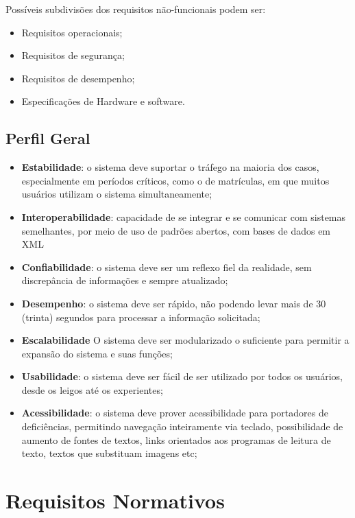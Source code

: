 \documentclass{book}
\begin{document}
Possíveis subdivisões dos requisitos não-funcionais podem ser: \\

\begin{itemize}
	\item Requisitos operacionais;
	\item Requisitos de segurança;
	\item Requisitos de desempenho;
	\item Especificações de Hardware e software.
\end{itemize}


\subsection{Perfil Geral}

\begin{itemize}
	\item \textbf{Estabilidade}: o sistema deve suportar o tráfego na maioria dos casos,
	especialmente em períodos críticos, como o de matrículas, em que muitos usuários utilizam o 
	sistema simultaneamente;
	\item \textbf{Interoperabilidade}: capacidade de se integrar e se comunicar com sistemas semelhantes,
	por meio de uso de padrões abertos, com bases de dados em XML
	\item \textbf{Confiabilidade}: o sistema deve ser um reflexo fiel da realidade, sem
	discrepância de informações e sempre atualizado;
	\item \textbf{Desempenho}: o sistema deve ser rápido, não podendo levar mais de 30 (trinta)
	segundos para processar a informação solicitada;
	\item \textbf{Escalabilidade} O sistema deve ser modularizado o suficiente para permitir a expansão do sistema e suas funções;
	\item \textbf{Usabilidade}: o sistema deve ser fácil de ser utilizado por todos os usuários,
	desde os leigos até os experientes;
	\item \textbf{Acessibilidade}: o sistema deve prover acessibilidade para portadores de deficiências,
	permitindo navegação inteiramente via teclado, possibilidade de aumento de fontes de textos, links orientados aos programas de leitura de texto, textos que substituam imagens etc;
\end{itemize}




\section{Requisitos Normativos}
\end{document}
